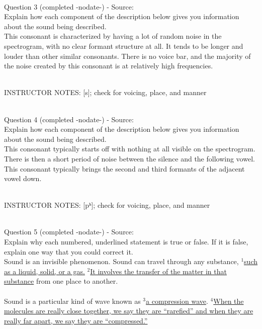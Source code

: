 \documentclass[12pt]{article}
\begin{document}
~\\

{\large Question 3} (completed -nodate-) - Source: \\

Explain how each component of the description below gives you information about the sound being described.\\

This consonant is characterized by having a lot of random noise in the spectrogram, with no clear formant structure at all. It tends to be longer and louder than other similar consonants. There is no voice bar, and the majority of the noise created by this consonant is at relatively high frequencies.


~\\
INSTRUCTOR NOTES: [s]; check for voicing, place, and manner


~\\

{\large Question 4} (completed -nodate-) - Source: \\

Explain how each component of the description below gives you information about the sound being described.\\

This consonant typically starts off with nothing at all visible on the spectrogram. There is then a short period of noise between the silence and the following vowel. This consonant typically brings the second and third formants of the adjacent vowel down.


~\\
INSTRUCTOR NOTES: [pʰ]; check for voicing, place, and manner


~\\

{\large Question 5} (completed -nodate-) - Source: \\

Explain why each numbered, underlined statement is true or false. If it is false, explain one way that you could correct it.\\

Sound is an invisible phenomenon. Sound can travel through any substance, $^1$\ul{such as a liquid, solid, or a gas.} $^2$\ul{It involves the transfer of the matter in that substance} from one place to another.\\\\Sound is a particular kind of wave known as $^3$\ul{a compression wave}. $^4$\ul{When the molecules are really close together, we say they are ``rarefied'' and when they are really far apart, we say they are ``compressed.''}
\end{document}
